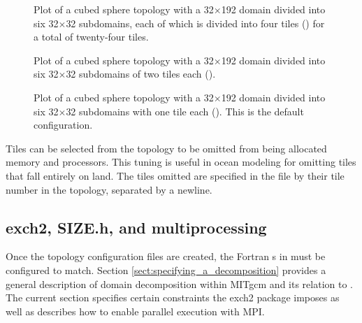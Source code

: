 \begin{figure}
\begin{center}
\end{center} 

\caption{Plot of a cubed sphere topology with a 32$\times$192 domain
divided into six 32$\times$32 subdomains, each of which is divided
into four tiles () for a total of twenty-four
tiles.  } \label{fig:24tile}
\end{figure}

\begin{figure}
\begin{center}
\end{center} 
\caption{Plot of a cubed sphere topology with a 32$\times$192 domain
divided into six 32$\times$32 subdomains of two tiles each
 ().
} \label{fig:12tile}
\end{figure}

\begin{figure}
\begin{center}
\end{center} 
\caption{Plot of a cubed sphere topology with a 32$\times$192 domain
divided into six 32$\times$32 subdomains with one tile each
().  This is the default configuration.
  }
\label{fig:6tile}
\end{figure}


Tiles can be selected from the topology to be omitted from being
allocated memory and processors.  This tuning is useful in ocean
modeling for omitting tiles that fall entirely on land.  The tiles
omitted are specified in the file
by their tile number in the topology, separated by a newline. \\




\subsection{exch2, SIZE.h, and multiprocessing}
\label{sec:exch2mpi}

Once the topology configuration files are created, the Fortran
s in  must be configured to match.
Section \ref{sect:specifying_a_decomposition}  provides a general description of domain
decomposition within MITgcm and its relation to . The
current section specifies certain constraints the exch2 package
imposes as well as describes how to enable parallel execution with
MPI. \\

